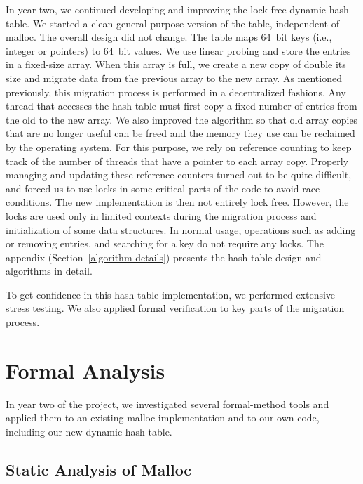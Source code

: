 \documentclass[twoside,12pt]{cslreport}
\begin{document}
In year two, we continued developing and improving the lock-free
dynamic hash table. We started a clean general-purpose version of the
table, independent of malloc. The overall design did not change. The
table maps 64~bit keys (i.e., integer or pointers) to 64~bit values.
We use linear probing and store the entries in a fixed-size
array. When this array is full, we create a new copy of double its
size and migrate data from the previous array to the new array. As
mentioned previously, this migration process is performed in a
decentralized fashions. Any thread that accesses the hash table must
first copy a fixed number of entries from the old to the new array.
We also improved the algorithm so that old array copies that are no
longer useful can be freed and the memory they use can be reclaimed by
the operating system. For this purpose, we rely on reference counting
to keep track of the number of threads that have a pointer to each
array copy. Properly managing and updating these reference counters
turned out to be quite difficult, and forced us to use locks in some
critical parts of the code to avoid race conditions. The new
implementation is then not entirely lock free. However, the locks are
used only in limited contexts during the migration process and
initialization of some data structures. In normal usage, operations
such as adding or removing entries, and searching for a key do not
require any locks. The appendix (Section~\ref{algorithm-details})
presents the hash-table design and algorithms in detail.

To get confidence in this hash-table implementation, we performed
extensive stress testing. We also applied formal verification to key
parts of the migration process.


\section{Formal Analysis}
\label{verification}

In year two of the project, we investigated several formal-method
tools and applied them to an existing malloc implementation and to our
own code, including our new dynamic hash table.

\subsection{Static Analysis of Malloc}
\end{document}
